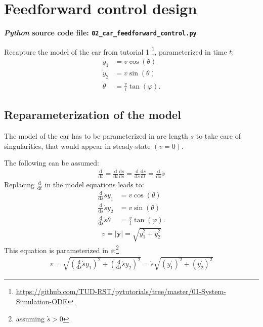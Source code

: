 \documentclass[a4paper,11pt,headings=standardclasses,parskip=half]{scrartcl}
\renewcommand{\d}{\mathrm{d}} %
\newcommand{\py}{\emph{Python}\xspace}
\begin{document}
\section{Feedforward control design}
\label{sec:ffcontrol}
\textbf{\py source code file: \texttt{02\_car\_feedforward\_control.py}}

Recapture the model of the car from tutorial 1 \footnote{\url{https://github.com/TUD-RST/pytutorials/tree/master/01-System-Simulation-ODE}}, parameterized in time $t$:
\begin{subequations}
\begin{align}
\dot y_1 &= v \cos(\theta)\\
\dot y_2 &= v \sin(\theta)\\
\dot \theta &= \frac{v}{l}\tan(\varphi).
\end{align}
\end{subequations}
\subsection{Reparameterization of the model}
The model of the car has to be parameterized in arc length $s$ to take care of singularities, that would appear in steady-state $(v=0)$.

The following can be assumed:
\begin{align*}
\frac{\d}{\d t} = \frac{\d}{\d t}\frac{\d s}{\d s} = \frac{\d}{\d s}\frac{\d s}{\d t} = \frac{\d}{\d s}\dot s
\end{align*}
Replacing $\frac{\d}{\d t}$ in the model equations leads to:
\begin{subequations}
\begin{align}
\frac{\d}{\d s}\dot s y_1 &= v \cos(\theta)\\
\frac{\d}{\d s}\dot s y_2 &= v \sin(\theta)\\
\frac{\d}{\d s}\dot s \theta &= \frac{v}{l}\tan(\varphi).
\end{align}
\end{subequations}
\begin{align}
v = |\dot{\bm{y}}| = \sqrt{\dot y_1^2+\dot y_2^2}
\end{align}
This equation is parameterized in $s$:\footnote{assuming $\dot s > 0$} 
\begin{align}
v = \sqrt{(\frac{\d}{\d s}\dot sy_1)^2+(\frac{\d}{\d s}\dot s y_2)^2}=\dot s \sqrt{(y_1^\prime)^2+(y_2^\prime)^2}
\end{align}
 
\end{document}
